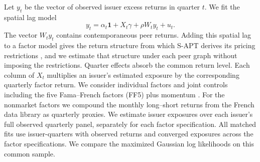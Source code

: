Let $y_t$ be the vector of observed issuer excess returns in quarter $t$.
We fit the spatial lag model
\[
  y_t=\alpha_t\mathbf{1}+X_t\gamma+\rho W_t y_t+u_t .
\]
The vector $W_t y_t$ contains contemporaneous peer returns. Adding this
spatial lag to a factor model gives the return structure from which S-APT
derives its pricing restrictions \citep{kou2018}, and we estimate that
structure under each peer graph without imposing the restrictions. Quarter
effects absorb the common return level. Each column of $X_t$ multiplies
an issuer's estimated exposure by the corresponding quarterly factor
return. We consider individual factors and joint controls including the
five Fama--French factors (FF5) plus momentum
\citep{fama2015,carhart1997}. For the nonmarket factors we compound the
monthly long--short returns from the French data library as quarterly
proxies. We estimate issuer exposures over each issuer's full observed
quarterly panel, separately for each factor specification. All matched fits
use issuer-quarters with observed returns and converged exposures across
the factor specifications. We compare the maximized Gaussian log likelihoods
on this common sample.
